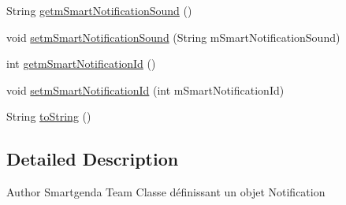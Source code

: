 \begin{DoxyCompactItemize}
\item 
String \hyperlink{classcom_1_1agenda_1_1ter_1_1model_1_1_smart_notification_ad66acb801c4d69a94fade4ae3919cc58}{getm\-Smart\-Notification\-Sound} ()
\item 
void \hyperlink{classcom_1_1agenda_1_1ter_1_1model_1_1_smart_notification_a5ab098496d817275edf6f66e7b7b211d}{setm\-Smart\-Notification\-Sound} (String m\-Smart\-Notification\-Sound)
\item 
int \hyperlink{classcom_1_1agenda_1_1ter_1_1model_1_1_smart_notification_a5ced243fda28aa4c5e207b9585737676}{getm\-Smart\-Notification\-Id} ()
\item 
void \hyperlink{classcom_1_1agenda_1_1ter_1_1model_1_1_smart_notification_a879621dc40dd886f2e60333bc5b8f248}{setm\-Smart\-Notification\-Id} (int m\-Smart\-Notification\-Id)
\item 
String \hyperlink{classcom_1_1agenda_1_1ter_1_1model_1_1_smart_notification_ab07fe5de804642cf6183a9dc626fa979}{to\-String} ()
\end{DoxyCompactItemize}


\subsection{Detailed Description}
\begin{DoxyAuthor}{Author}
Smartgenda Team Classe définissant un objet Notification 
\end{DoxyAuthor}


